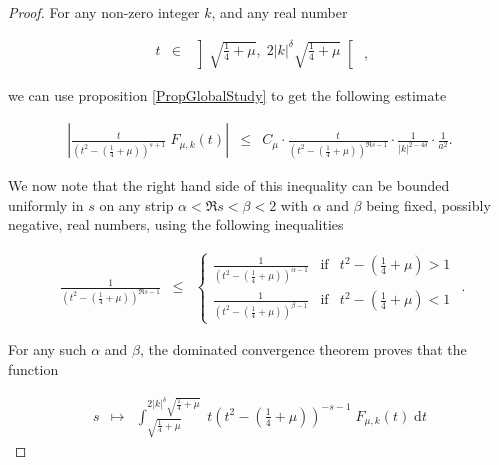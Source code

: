 \documentclass{jams-l}
\theoremstyle{definition}
\theoremstyle{remark}
\numberwithin{equation}{section}
\begin{document}
            \begin{proof}
            
                For any non-zero integer $k$, and any real number
            
                \[ \begin{array}{ccc}
                        t & \in & \left] \sqrt{\frac{1}{4}+\mu}, \; 2 \left \vert k \right \vert^{\delta} \sqrt{\frac{1}{4}+\mu} \right[
                    \end{array} , \]
                
                \noindent we can use proposition \ref{PropGlobalStudy} to get the following estimate
            
                \[ \begin{array}{lll}
                        \left \vert \frac{t}{\left( t^2 - \left( \frac{1}{4}+\mu \right) \right)^{s+1}} \; F_{\mu,k} \left( t \right) \right \vert &\leqslant & C_{\mu} \cdot \frac{t}{\left( t^2 - \left( \frac{1}{4}+\mu \right) \right)^{\Re s-1}} \cdot \frac{1}{\left \vert k \right \vert^{2-4 \delta}} \cdot \frac{1}{a^2}.
                    \end{array} \]
            
                \noindent We now note that the right hand side of this inequality can be bounded uniformly in $s$ on any strip $\alpha < \Re s < \beta < 2$ with $\alpha$ and $\beta$ being fixed, possibly negative, real numbers, using the following inequalities
            
                \[ \begin{array}{lll}
                        \frac{1}{\left( t^2 - \left( \frac{1}{4}+\mu \right) \right)^{\Re s-1}} & \leqslant & \left \{ \begin{array}{lcl} \frac{1}{\left( t^2 - \left( \frac{1}{4}+\mu \right) \right)^{\alpha-1}} & \text{if} & t^2 - \left( \frac{1}{4}+\mu \right) > 1 \\[1em]
                    
                        \frac{1}{\left( t^2 - \left( \frac{1}{4}+\mu \right) \right)^{\beta-1}} & \text{if} & t^2 - \left( \frac{1}{4}+\mu \right) < 1 \end{array} \right.
                    \end{array} . \]
            
                \noindent For any such $\alpha$ and $\beta$, the dominated convergence theorem proves that the function
            
                \[ \begin{array}{lll}
                        s & \longmapsto & \int_{\sqrt{\frac{1}{4}+\mu}}^{2 \left \vert k \right \vert^{\delta} \sqrt{\frac{1}{4}+\mu}} \; t \left( t^2 - \left( \frac{1}{4}+\mu \right) \right)^{-s-1} \; F_{\mu,k} \left( t \right) \; \text{d}t
                    \end{array} \]
            

\end{proof}
\end{document}
